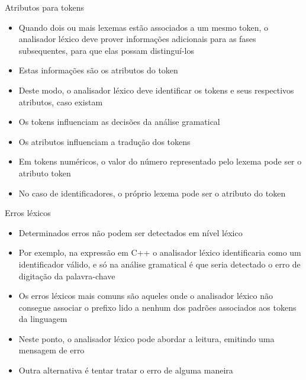 \begin{frame}[fragile]{Atributos para tokens}

    \begin{itemize}
        \item Quando dois ou mais lexemas estão associados a um mesmo token, o analisador léxico deve prover informações adicionais para as fases subsequentes,
            para que elas possam distinguí-los

        \item Estas informações são os atributos do token

        \item Deste modo, o analisador léxico deve identificar os tokens e seus respectivos atributos, caso existam

        \item Os tokens influenciam as decisões da análise gramatical

        \item Os atributos influenciam a tradução dos tokens

        \item Em tokens numéricos, o valor do número representado pelo lexema pode ser o atributo token

        \item No caso de identificadores, o próprio lexema pode ser o atributo do token
    \end{itemize}

\end{frame}

\begin{frame}[fragile]{Erros léxicos}

    \begin{itemize}
        \item Determinados erros não podem ser detectados em nível léxico

        \item Por exemplo, na expressão em C++
        o analisador léxico identificaria  como um identificador válido, e só na análise gramatical é que seria detectado o erro de digitação da
        palavra-chave 

        \item Os erros léxicos mais comuns são aqueles onde o analisador léxico não consegue associar o prefixo lido a nenhum dos padrões associados aos tokens
        da linguagem

        \item Neste ponto, o analisador léxico pode abordar a leitura, emitindo uma mensagem de erro

        \item Outra alternativa é tentar tratar o erro de alguma maneira
    \end{itemize}

\end{frame}

